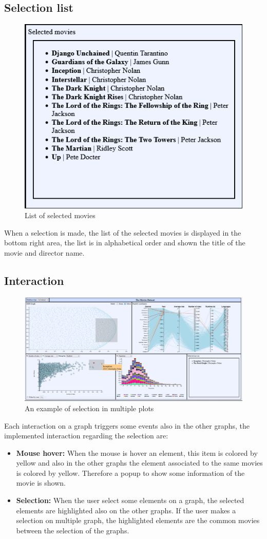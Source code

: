 \documentclass[]{article}
\begin{document}
\subsection{Selection list}
\begin{figure}[H]
	\centering
	\includegraphics[width=0.7\linewidth]{images/selection_list}
	\caption[Selection list]{List of selected movies}
	\label{fig:selectionlist}
\end{figure}
When a selection is made, the list of the selected movies is displayed in the bottom right area, the list is in alphabetical order and shown the title of the movie and director name.
\subsection{Interaction}
\begin{figure}[H]
	\centering
	\includegraphics[width=1\linewidth]{images/interaction1}
	\caption[Interaction example]{An example of selection in multiple plots}
	\label{fig:interaction1}
\end{figure}
Each interaction on a graph triggers some events also in the other graphs, the implemented interaction regarding the selection are:
\begin{itemize}
	\item \textbf{Mouse hover:} When the mouse is hover an element, this item is colored by yellow and also in the other graphs the element associated to the same movies is colored by yellow. Therefore a popup to show some information of the movie is shown.
	\item \textbf{Selection:} When the user select some elements on a graph, the selected elements are highlighted also on the other graphs. If the user makes a selection on multiple graph, the highlighted elements are the common movies between the selection of the graphs.
\end{itemize}
\end{document}
